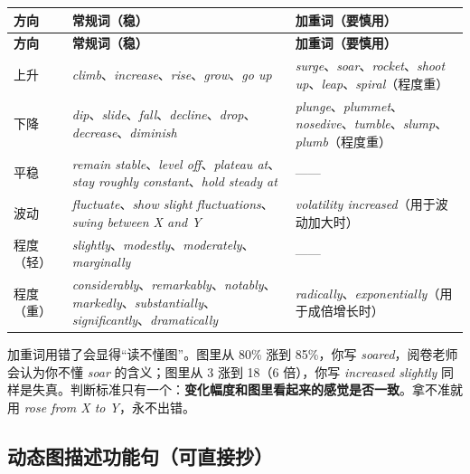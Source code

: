 \documentclass[11pt,a4paper]{ctexart}
\newcommand{\en}[1]{\textit{#1}}
\newcommand{\zone}[1]{\par\addvspace{3pt}\noindent{\bfseries\color{accent}【雷区】}#1\par\addvspace{3pt}}
\begin{document}
\begin{longtable}{L{2.8cm} L{5.8cm} L{6.6cm}}
\toprule
\textbf{方向} & \textbf{常规词（稳）} & \textbf{加重词（要慎用）}\\
\midrule
\endfirsthead
\toprule
\textbf{方向} & \textbf{常规词（稳）} & \textbf{加重词（要慎用）}\\
\midrule
\endhead
上升 & \en{climb}、\en{increase}、\en{rise}、\en{grow}、\en{go up} & \en{surge}、\en{soar}、\en{rocket}、\en{shoot up}、\en{leap}、\en{spiral}（程度重）\\
\midrule
下降 & \en{dip}、\en{slide}、\en{fall}、\en{decline}、\en{drop}、\en{decrease}、\en{diminish} & \en{plunge}、\en{plummet}、\en{nosedive}、\en{tumble}、\en{slump}、\en{plumb}（程度重）\\
\midrule
平稳 & \en{remain stable}、\en{level off}、\en{plateau at}、\en{stay roughly constant}、\en{hold steady at} & ——\\
\midrule
波动 & \en{fluctuate}、\en{show slight fluctuations}、\en{swing between X and Y} & \en{volatility increased}（用于波动加大时）\\
\midrule
程度（轻） & \en{slightly}、\en{modestly}、\en{moderately}、\en{marginally} & ——\\
\midrule
程度（重） & \en{considerably}、\en{remarkably}、\en{notably}、\en{markedly}、\en{substantially}、\en{significantly}、\en{dramatically} & \en{radically}、\en{exponentially}（用于成倍增长时）\\
\bottomrule
\end{longtable}

\zone{加重词用错了会显得“读不懂图”。图里从 80\% 涨到 85\%，你写 \en{soared}，阅卷老师会认为你不懂 \en{soar} 的含义；图里从 3 涨到 18（6 倍），你写 \en{increased slightly} 同样是失真。判断标准只有一个：\textbf{变化幅度和图里看起来的感觉是否一致}。拿不准就用 \en{rose from X to Y}，永不出错。}

\subsection{动态图描述功能句（可直接抄）}
\end{document}
